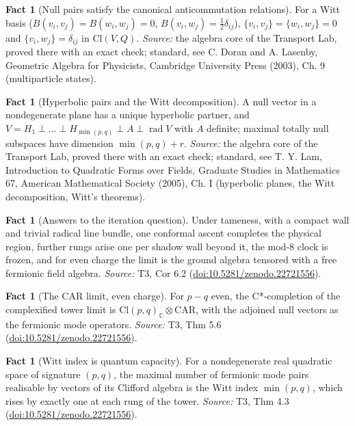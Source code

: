 \documentclass[11pt]{article}
\theoremstyle{definition}
\newtheorem{fact}[theorem]{Fact}
\theoremstyle{plain}
\providecommand{\C}{}\renewcommand{\C}{\mathbb{C}}
\providecommand{\CAR}{}\renewcommand{\CAR}{\mathrm{CAR}}
\providecommand{\Cl}{}\renewcommand{\Cl}{\mathrm{Cl}}
\begin{document}
\begin{fact}[Null pairs satisfy the canonical anticommutation relations]\label{c:std-algebra.witt-basis-car}
For a Witt basis ($B(v_i,v_j) = B(w_i,w_j) = 0$, $B(v_i,w_j) = \tfrac12\delta_{ij}$), $\{v_i,v_j\} = \{w_i,w_j\} = 0$ and $\{v_i,w_j\} = \delta_{ij}$ in $\Cl(V,Q)$.
\emph{Source:} the algebra core of the Transport Lab, proved there with an exact check; standard, see C. Doran and A. Lasenby, Geometric Algebra for Physicists, Cambridge University Press (2003), Ch. 9 (multiparticle states).
\end{fact}

\begin{fact}[Hyperbolic pairs and the Witt decomposition]\label{c:std-algebra.witt-decomposition}
A null vector in a nondegenerate plane has a unique hyperbolic partner, and $V = H_1 \perp \dots \perp H_{\min(p,q)} \perp A \perp \operatorname{rad} V$ with $A$ definite; maximal totally null subspaces have dimension $\min(p,q) + r$.
\emph{Source:} the algebra core of the Transport Lab, proved there with an exact check; standard, see T. Y. Lam, Introduction to Quadratic Forms over Fields, Graduate Studies in Mathematics 67, American Mathematical Society (2005), Ch. I (hyperbolic planes, the Witt decomposition, Witt's theorems).
\end{fact}

\begin{fact}[Answers to the iteration question]\label{c:tower.answers-iteration-question}
Under tameness, with a compact wall and trivial radical line bundle, one conformal ascent completes the physical region, further rungs arise one per shadow wall beyond it, the mod-8 clock is frozen, and for even charge the limit is the ground algebra tensored with a free fermionic field algebra.
\emph{Source:} T3, Cor 6.2 (\href{https://doi.org/10.5281/zenodo.22721556}{doi:10.5281/zenodo.22721556}).
\end{fact}

\begin{fact}[The CAR limit, even charge]\label{c:tower.car-limit-even-charge}
For $p - q$ even, the C*-completion of the complexified tower limit is $\Cl(p,q)_\C \otimes \CAR$, with the adjoined null vectors as the fermionic mode operators.
\emph{Source:} T3, Thm 5.6 (\href{https://doi.org/10.5281/zenodo.22721556}{doi:10.5281/zenodo.22721556}).
\end{fact}

\begin{fact}[Witt index is quantum capacity]\label{c:tower.witt-index-quantum-capacity}
For a nondegenerate real quadratic space of signature $(p,q)$, the maximal number of fermionic mode pairs realisable by vectors of its Clifford algebra is the Witt index $\min(p,q)$, which rises by exactly one at each rung of the tower.
\emph{Source:} T3, Thm 4.3 (\href{https://doi.org/10.5281/zenodo.22721556}{doi:10.5281/zenodo.22721556}).
\end{fact}
\end{document}
